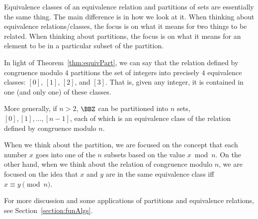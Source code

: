Equivalence classes of an equivalence relation and partitions of sets are
essentially the same thing.  The main difference is in how we look at it.  When thinking about
equivalence relations/classes, the focus is on what it means for two things to be related.
When thinking about partitions, the focus is on what it means for an element to be in a particular
subset of the partition.

\begin{exa}\label{exa:modex}
In light of Theorem~\ref{thm:equivPart}, 
we can say that the relation defined by congruence modulo $4$ 
partitions the set of integers into precisely $4$ equivalence classes: $[0]$, $[1]$, $[2]$, and $[3]$.
That is, given any integer, it is contained in one (and only one) of these classes.

More generally, if $n>2$, $\BBZ$ can be partitioned into $n$ sets, $[0],[1],\ldots,[n-1]$, each of
which is an equivalence class of the relation defined by congruence modulo $n$.

When we think about the partition, we are focused on the concept that each number $x$ goes into
one of the $n$ subsets based on the value $x\bmod n$.
On the other hand, when we think about the relation of congruence modulo $n$, we are focused on
the idea that $x$ and $y$ are in the same equivalence class iff $x\equiv y\pmod n$.
\end{exa}

For more discussion and some applications of partitions and equivalence relations, see Section~\ref{section:funAlgs}.
